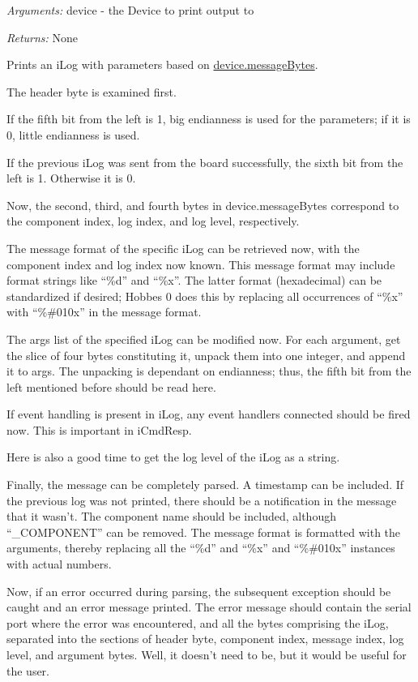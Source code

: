 \documentclass[12pt,letterpaper]{article}
\begin{document}
\emph{Arguments:} device - the Device to print output to

\emph{Returns:} None

Prints an iLog with parameters based on \hyperref[4.3.2.2.21]{device.messageBytes}.

The header byte is examined first.

If the fifth bit from the left is 1, big endianness is used for the parameters; if it is 0, little endianness is used.

If the previous iLog was sent from the board successfully, the sixth bit from the left is 1. Otherwise it is 0.

Now, the second, third, and fourth bytes in device.messageBytes correspond to the component index, log index, and log level, respectively.

The message format of the specific iLog can be retrieved now, with the component index and log index now known. This message format may include format strings like ``\%d'' and ``\%x''. The latter format (hexadecimal) can be standardized if desired; Hobbes 0 does this by replacing all occurrences of ``\%x'' with ``\%\#010x'' in the message format.

The args list of the specified iLog can be modified now. For each argument, get the slice of four bytes constituting it, unpack them into one integer, and append it to args. The unpacking is dependant on endianness; thus, the fifth bit from the left mentioned before should be read here.

If event handling is present in iLog, any event handlers connected should be fired now. This is important in iCmdResp.

Here is also a good time to get the log level of the iLog as a string.

Finally, the message can be completely parsed. A timestamp can be included. If the previous log was not printed, there should be a notification in the message that it wasn't. The component name should be included, although ``\_COMPONENT'' can be removed. The message format is formatted with the arguments, thereby replacing all the ``\%d'' and ``\%x'' and ``\%\#010x'' instances with actual numbers.

Now, if an error occurred during parsing, the subsequent exception should be caught and an error message printed. The error message should contain the serial port where the error was encountered, and all the bytes comprising the iLog, separated into the sections of header byte, component index, message index, log level, and argument bytes. Well, it doesn't need to be, but it would be useful for the user.
\end{document}
